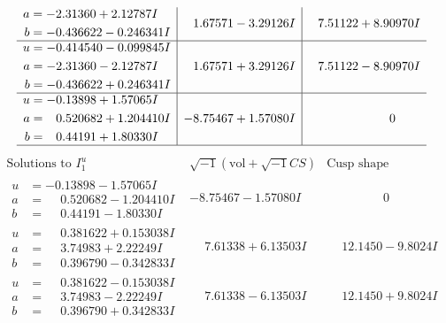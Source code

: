 \documentclass[1p]{elsarticle_modified}
\theoremstyle{definition}
\newcommand{\I}{\sqrt{-1}}
\begin{document}
$$\begin{array}{c|c|c}
\begin{aligned}
a &= -2.31360 + 2.12787 I \\
b &= -0.436622 - 0.246341 I\end{aligned}
 & \phantom{-}1.67571 - 3.29126 I & \phantom{-}7.51122 + 8.90970 I \\ \hline\begin{aligned}
u &= -0.414540 - 0.099845 I \\
a &= -2.31360 - 2.12787 I \\
b &= -0.436622 + 0.246341 I\end{aligned}
 & \phantom{-}1.67571 + 3.29126 I & \phantom{-}7.51122 - 8.90970 I \\ \hline\begin{aligned}
u &= -0.13898 + 1.57065 I \\
a &= \phantom{-}0.520682 + 1.204410 I \\
b &= \phantom{-}0.44191 + 1.80330 I\end{aligned}
 & -8.75467 + 1.57080 I & \phantom{-0.000000 } 0\\
 \hline 
 \end{array}$$\newpage$$\begin{array}{c|c|c}  
\text{Solutions to }I^u_{1}& \I (\text{vol} + \sqrt{-1}CS) & \text{Cusp shape}\\
 \hline 
\begin{aligned}
u &= -0.13898 - 1.57065 I \\
a &= \phantom{-}0.520682 - 1.204410 I \\
b &= \phantom{-}0.44191 - 1.80330 I\end{aligned}
 & -8.75467 - 1.57080 I & \phantom{-0.000000 } 0 \\ \hline\begin{aligned}
u &= \phantom{-}0.381622 + 0.153038 I \\
a &= \phantom{-}3.74983 + 2.22249 I \\
b &= \phantom{-}0.396790 - 0.342833 I\end{aligned}
 & \phantom{-}7.61338 + 6.13503 I & \phantom{-}12.1450 - 9.8024 I \\ \hline\begin{aligned}
u &= \phantom{-}0.381622 - 0.153038 I \\
a &= \phantom{-}3.74983 - 2.22249 I \\
b &= \phantom{-}0.396790 + 0.342833 I\end{aligned}
 & \phantom{-}7.61338 - 6.13503 I & \phantom{-}12.1450 + 9.8024 I \\ \hline\begin{aligned}

\end{aligned}
\end{array}$$
\end{document}
